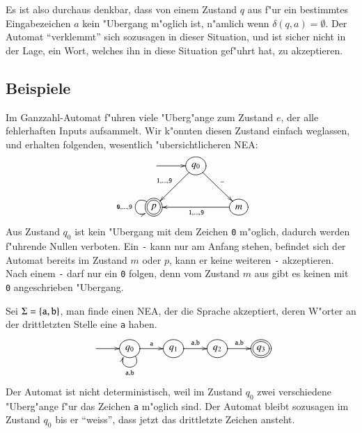 Es ist also durchaus denkbar, dass von einem Zustand $q$ aus f"ur ein
bestimmtes Eingabezeichen $a$ kein "Ubergang m"oglich ist, n"amlich
wenn $\delta(q,a)=\emptyset$. Der Automat ``verklemmt'' sich sozusagen
in dieser Situation, und ist sicher nicht in der Lage, ein Wort, welches
ihn in diese Situation gef"uhrt hat, zu akzeptieren.


\subsection{Beispiele}
\begin{beispiel}
Im Ganzzahl-Automat f"uhren viele "Uberg"ange zum Zustand $e$, der
alle fehlerhaften Inputs aufsammelt. Wir k"onnten diesen Zustand einfach
weglassen, und erhalten folgenden, wesentlich "ubersichtlicheren NEA:
\[
\entrymodifiers={++[o][F]}
\xymatrix{
*+\txt{}\ar[r]
	&{q_0}  \ar[dl]_{{\tt 1},\dots,{\tt 9}} \ar[dr]^{\tt -}
\\
*++[o][F=]{p}\ar@(ul,dl)_{{\tt 0},\dots,{\tt 9}}
	&*+\txt{}
		&{m} \ar[ll]^{{\tt 1},\dots,{\tt 9}}
}
\]
Aus Zustand $q_0$ ist kein "Ubergang mit dem Zeichen {\tt 0} m"oglich,
dadurch werden f"uhrende Nullen verboten.
Ein {\tt -} kann nur am Anfang
stehen, befindet sich der Automat bereits im Zustand $m$ oder $p$, kann 
er keine weiteren {\tt -} akzeptieren.
Nach einem {\tt -} darf nur ein {\tt 0} folgen, denn vom Zustand $m$
aus gibt es keinen mit {\tt 0} angeschrieben "Ubergang.
\end{beispiel}

\begin{beispiel}
Sei $\Sigma=\{{\tt a},{\tt b}\}$, man finde einen NEA, der die 
Sprache akzeptiert, deren W"orter an der drittletzten Stelle
eine {\tt a} haben.
\[
\entrymodifiers={++[o][F]}
\xymatrix{
*+\txt{} \ar[r]
	&{q_0} \ar[r]^{\tt a} \ar@(dr,dl)^{{\tt a},{\tt b}}
		&{q_1}\ar[r]^{{\tt a},{\tt b}}
			&{q_2}\ar[r]^{{\tt a},{\tt b}}
				&*++[o][F=]{q_3}
}
\]
Der Automat ist nicht deterministisch, weil im Zustand $q_0$ zwei verschiedene
"Uberg"ange f"ur das Zeichen {\tt a} m"oglich sind. Der Automat bleibt
sozusagen im Zustand $q_0$ bis er ``weiss'', dass jetzt das drittletzte
Zeichen ansteht.
\end{beispiel}


